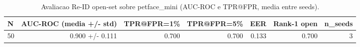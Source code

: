 \begin{table}[!htb]
\centering
\caption{Avaliacao Re-ID open-set sobre petface\_mini (AUC-ROC e TPR@FPR, media entre seeds).}
\label{tab:openset-resumo-petface_mini}
\begin{tabular}{lrrrrrr}
\toprule
N & AUC-ROC (media +/- std) & TPR@FPR=1\% & TPR@FPR=5\% & EER & Rank-1 open & n\_seeds \\
\midrule
50 & 0.900 +/- 0.111 & 0.700 & 0.700 & 0.133 & 0.700 & 3 \\
\bottomrule
\end{tabular}
\end{table}
